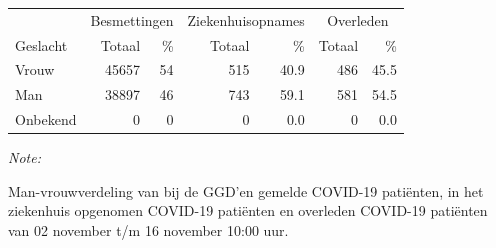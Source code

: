 \documentclass[
  english,
  man,floatsintext]{apa6}
\begin{document}
\begin{table}[H]
\centering\begingroup\fontsize{11}{13}\selectfont

\begin{threeparttable}
\begin{tabular}{lrrrrrr}
\toprule
\multicolumn{1}{c}{ } & \multicolumn{2}{c}{Besmettingen} & \multicolumn{2}{c}{Ziekenhuisopnames} & \multicolumn{2}{c}{Overleden} \\
\cmidrule(l{3pt}r{3pt}){2-3} \cmidrule(l{3pt}r{3pt}){4-5} \cmidrule(l{3pt}r{3pt}){6-7}
Geslacht & Totaal & \% & Totaal & \% & Totaal & \%\\
\midrule
Vrouw & 45657 & 54 & 515 & 40.9 & 486 & 45.5\\
Man & 38897 & 46 & 743 & 59.1 & 581 & 54.5\\
Onbekend & 0 & 0 & 0 & 0.0 & 0 & 0.0\\
\bottomrule
\end{tabular}
\begin{tablenotes}
\item \textit{Note: } 
\item Man-vrouwverdeling van bij de GGD’en gemelde COVID-19 patiënten, in het ziekenhuis opgenomen COVID-19 patiënten en overleden COVID-19 patiënten van 02 november t/m 16 november 10:00 uur.
\end{tablenotes}
\end{threeparttable}
\endgroup{}
\end{table}
\newpage
\end{document}
